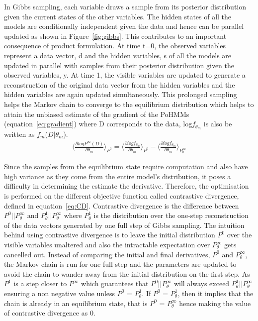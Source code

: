 \documentclass{acm_proc_article-sp}
\begin{document}
In Gibbs sampling, each variable draws a sample from its posterior distribution given the current states of the other variables. The hidden states of all the models are conditionally independent given the data and hence can be parallel updated as shown in Figure~\ref{fig:gibbs}. This contributes to an important consequence of product formulation. At time t=0, the observed variables represent a data vector, d and the hidden variables, s of all the models are updated in parallel with samples from their posterior distribution given the observed variables, y. At time 1, the visible variables are updated to generate a reconstruction of the original data vector from the hidden variables and the hidden variables are again updated simultaneously. This prolonged sampling helps the Markov chain to converge to the equilibrium distribution which helps to attain the unbiased estimate of the gradient of the PoHMMs (equation~\ref{eq:gradient}) where D corresponds to the data, log$f_{\theta_{m}}$ is also be written as $f_m$($D|\theta_m$). \\

\begin{eqnarray}
 \langle \frac {\partial log P^\infty(D)} {\partial\theta_{m}} \rangle_{P^0} = \langle \frac {\partial log f_{\theta_{m}}}{\partial \theta_m} \rangle_{P^0} 
- \langle \frac {\partial log f_{\theta_{m}}}{\partial \theta_m} \rangle_{P^\infty_\theta}
\label{eq:gradient}
\end{eqnarray}

Since the samples from the equilibrium state require computation and also have high variance as they come from the entire model's distribution, it poses a difficulty in determining the estimate the derivative. Therefore, the optimisation is performed on the different objective function called contrastive divergence, defined in equation~\ref{eq:CD}. Contrastive divergence is the difference between $P^0 || P^\infty_\theta$ and $P^1_\theta || P^\infty_\theta$ where $P^1_\theta$ is the distribution over the one-step reconstruction of the data vectors generated by one full step of Gibbs sampling. The intuition behind using contrastive divergence is to leave the initial distribution $P^{0}$ over the visible variables unaltered and also the intractable expectation over $P^\infty_\theta$ gets cancelled out. Instead of comparing the initial and final derivatives, $P^0$ and $P^\infty_\theta$, the Markov chain is run for one full step and the parameters are updated to avoid the chain to wander away from the initial distribution on the first step. As $P^1$ is a step closer to $P^\infty$ which guarantees that $P^0 || P^\infty_\theta$ will always exceed $P^1_\theta || P^\infty_\theta$ ensuring a non negative value unless $P^0$ = $P^1_\theta$. If $P^0$ = $P^1_\theta$, then it implies that the chain is already in an equilibrium state, that is $P^0$ = $P^\infty_\theta$ hence making the value of contrastive divergence as $0$.
\end{document}

